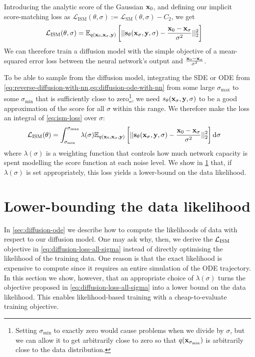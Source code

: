 Introducing the analytic score of the Gaussian ${\mathbf{x}}_0$, and defining our implicit score-matching loss as $\mathcal{L}_\text{ISM}(\theta, \sigma) := \mathcal{L}_\text{SM}(\theta, \sigma) - C_2$, we get
\begin{align} \label{eq:ism-loss}
    \mathcal{L}_\text{ISM}(\theta, \sigma) &= \mathbb{E}_{q({\mathbf{x}}_0, {\mathbf{x}}_\sigma, {\mathbf{y}})} \left[ 
    || {\mathbf{s}}_\theta({\mathbf{x}}_\sigma, {\mathbf{y}}, \sigma) - \frac{{\mathbf{x}}_0-{\mathbf{x}}_\sigma}{\sigma^2} ||_2^2 \right]
\end{align}
We can therefore train a diffusion model with the simple objective of a mean-squared error loss between the neural network's output and $\frac{{\mathbf{x}}_0-{\mathbf{x}}_\sigma}{\sigma^2}$.

To be able to sample from the diffusion model, integrating the SDE or ODE from \cref{eq:reverse-diffusion-with-nn,eq:diffusion-ode-with-nn} from some large $\sigma_\text{max}$ to some $\sigma_\text{min}$ that is sufficiently close to zero\footnote{Setting $\sigma_\text{min}$ to exactly zero would cause problems when we divide by $\sigma$, but we can allow it to get arbitrarily close to zero so that $q({\mathbf{x}}_{\sigma_\text{min}})$ is arbitrarily close to the data distribution.}, we need $s_\theta({\mathbf{x}}_\sigma, {\mathbf{y}}, \sigma)$ to be a good approximation of the score for all $\sigma$ within this range. We therefore make the loss an integral of \cref{eq:ism-loss} over $\sigma$:
\begin{align} \label{eq:diffusion-loss-all-sigma}
    \mathcal{L}_\text{ISM}(\theta) &= \int_{\sigma_\text{min}}^{\sigma_\text{max}} \lambda(\sigma) \mathbb{E}_{q({\mathbf{x}}_0, {\mathbf{x}}_\sigma, {\mathbf{y}})} \left[ 
    || {\mathbf{s}}_\theta({\mathbf{x}}_\sigma, {\mathbf{y}}, \sigma) - \frac{{\mathbf{x}}_0-{\mathbf{x}}_\sigma}{\sigma^2} ||_2^2 \right] \mathrm{d}\sigma
\end{align}
where $\lambda(\sigma)$ is a weighting function that controls how much network capacity is spent modelling the score function at each noise level. We show in \cref{sec:diffusion-likelihood} that, if $\lambda(\sigma)$ is set appropriately, this loss yields a lower-bound on the data likelihood.

\section{Lower-bounding the data likelihood} \label{sec:diffusion-likelihood}
In \cref{sec:diffusion-ode} we describe how to compute the likelihoods of data with respect to our diffusion model. One may ask why, then, we derive the ${\mathcal{L}}_\text{ISM}$ objective in \cref{eq:diffusion-loss-all-sigma} instead of directly optimising the likelihood of the training data. One reason is that the exact likelihood is expensive to compute since it requires an entire simulation of the ODE trajectory. In this section we show, however, that an appropriate choice of $\lambda(\sigma)$ turns the objective proposed in \cref{eq:diffusion-loss-all-sigma} into a lower bound on the data likelihood. This enables likelihood-based training with a cheap-to-evaluate training objective.

